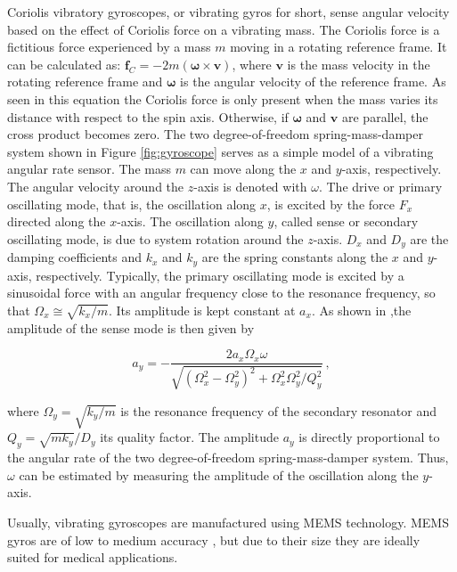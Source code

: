 Coriolis vibratory gyroscopes, or vibrating gyros for short, sense angular velocity based on the effect of Coriolis force on a vibrating mass. The Coriolis force is a fictitious force experienced by a mass $m$ moving in a rotating reference frame. It can be calculated as: $\mathbf{f}_C = -2m(\bm{\omega} \times \mathbf{v})$, where $\mathbf{v}$ is the mass velocity in the rotating reference frame and $\bm{\omega}$ is the angular velocity of the reference frame. As seen in this equation the Coriolis force is only present when the mass varies its distance with respect to the spin axis. Otherwise, if $\bm{\omega}$ and $\mathbf{v}$ are parallel, the cross product becomes zero. The two degree-of-freedom spring-mass-damper system shown in Figure \ref{fig:gyroscope} serves as a simple model of a vibrating angular rate sensor. The mass $m$ can move along the $x$ and $y$-axis, respectively. The angular velocity around the $z$-axis is denoted with $\omega$. The drive or primary oscillating mode, that is, the oscillation along $x$, is excited by the force $F_x$ directed along the $x$-axis. The oscillation along $y$, called sense or secondary oscillating mode, is due to system rotation around the $z$-axis. $D_x$ and $D_y$ are the damping coefficients and $k_x$ and $k_y$ are the spring constants along the $x$ and $y$-axis, respectively. Typically, the primary oscillating mode is excited by a sinusoidal force with an angular frequency close to the resonance frequency, so that $\Omega_x \cong \sqrt{k_x/m}$. Its amplitude is kept constant at $a_x$. As shown in \cite{armenise2010advances},the amplitude of the sense mode is then given by

\begin{equation}
  a_y = -\frac{2 a_x \Omega_x \omega}{\sqrt{(\Omega^2_x - \Omega^2_y)^2 + \Omega^2_x \Omega^2_y / Q^2_y}}\,,
\end{equation}

\noindent
where $\Omega_y=\sqrt{k_y/m}$ is the resonance frequency of the secondary resonator and $Q_y = \sqrt{m k_y}/D_y$ its quality factor. The amplitude $a_y$ is directly proportional to the angular rate of the two degree-of-freedom spring-mass-damper system. Thus, $\omega$ can be estimated by measuring the amplitude of the oscillation along the $y$-axis.

Usually, vibrating gyroscopes are manufactured using MEMS technology. MEMS gyros are of low to medium accuracy \cite{bhattacharyya_inertial_sensors_applications_13}, but due to their size they are ideally suited for medical applications.

